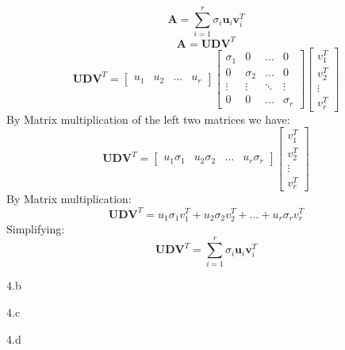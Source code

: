 \begin{answer}
  \[ \mathbf{A} = \sum_{i=1}^{r}\sigma_{i}\mathbf{u}_{i}\mathbf{v}^{T}_{i} \]
\[ \mathbf{A} = \mathbf{U}\mathbf{D}\mathbf{V}^{T} \]
\[ \mathbf{U}\mathbf{D}\mathbf{V}^{T} = 
\begin{bmatrix} 
    u_1 & u_2 & \dots & u_r 
\end{bmatrix} 
\begin{bmatrix} 
    \sigma_1 & 0 & \dots & 0 \\
    0 & \sigma_2 & \dots & 0 \\
    \vdots & \vdots & \ddots & \vdots \\
    0 & 0 & \dots & \sigma_r
\end{bmatrix}
\begin{bmatrix}
    v_1^T \\ v_2^T \\ \vdots \\ v_r^T
\end{bmatrix}
\]
By Matrix multiplication of the left two matrices we have:
\[
\mathbf{U}\mathbf{D}\mathbf{V}^{T} = 
\begin{bmatrix}
    u_1\sigma_1 & u_2\sigma_2 & \dots & u_r\sigma_r
\end{bmatrix}
\begin{bmatrix}
    v_1^T \\ v_2^T \\ \vdots \\ v_r^T
\end{bmatrix}
\]
By Matrix multiplication:
\[
\mathbf{U}\mathbf{D}\mathbf{V}^{T} = u_1\sigma_1v_1^T + u_2\sigma_2v_2^T + \dots + u_r\sigma_rv_r^T
\]
Simplifying:
\[
\mathbf{U}\mathbf{D}\mathbf{V}^{T} = \sum_{i=1}^{r}\sigma_{i}\mathbf{u}_{i}\mathbf{v}^{T}_{i}
\]
\end{answer}
\clearpage

\LARGE
4.b
\normalsize

\begin{answer}
\end{answer}
\clearpage

\LARGE
4.c
\normalsize

\begin{answer}
\end{answer}
\clearpage

\LARGE
4.d
\normalsize

\begin{answer}
\end{answer}
\clearpage


